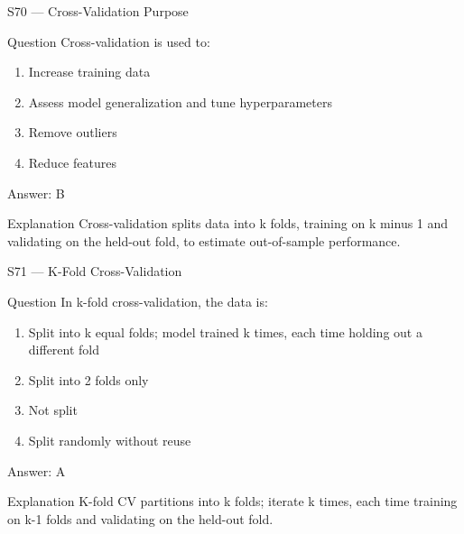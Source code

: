 \documentclass[aspectratio=169,8pt]{beamer}
\begin{document}
	\begin{frame}{S70 --- Cross-Validation Purpose}
		\begin{block}{Question}
			Cross-validation is used to:
			\begin{enumerate}
				\item Increase training data
				\item Assess model generalization and tune hyperparameters
				\item Remove outliers
				\item Reduce features
			\end{enumerate}
		\end{block}
		\begin{exampleblock}{Answer: B}\end{exampleblock}
		\begin{block}{Explanation}
			Cross-validation splits data into k folds, training on k minus 1 and validating on the held-out fold, to estimate out-of-sample performance.
		\end{block}
	\end{frame}
	
	\begin{frame}{S71 --- K-Fold Cross-Validation}
		\begin{block}{Question}
			In k-fold cross-validation, the data is:
			\begin{enumerate}
				\item Split into k equal folds; model trained k times, each time holding out a different fold
				\item Split into 2 folds only
				\item Not split
				\item Split randomly without reuse
			\end{enumerate}
		\end{block}
		\begin{exampleblock}{Answer: A}\end{exampleblock}
		\begin{block}{Explanation}
			K-fold CV partitions into k folds; iterate k times, each time training on k-1 folds and validating on the held-out fold.
		\end{block}
	\end{frame}
	
\end{document}

